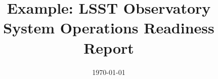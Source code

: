 \documentclass[modern]{aastex62}
\begin{document}

\date{\today}


\title{{\bf Example:} LSST Observatory System Operations Readiness Report}








\end{document}
